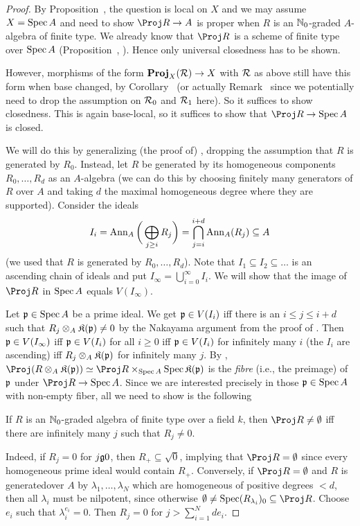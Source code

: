 \documentclass[a4paper,parskip=half,numbers=enddot, DIV=12]{scrreprt}
\begin{document}
\begin{proof}
	By Proposition~, the question is local on $X$ and we may assume $X=\operatorname{Spec} A$ and need to show $\Proj R\morphism A$ is proper when $R$ is an $\mathbb{N}_0$-graded $A$-algebra of finite type. We already know that $\Proj R$ is a scheme of finite type over $\operatorname{Spec} A$ (Proposition~, ). Hence only universal closedness has to be shown.
	
	However, morphisms of the form $\PROJ_X(\Rr)\morphism X$ with $\mathcal{R}$ as above still have this form when base changed, by Corollary~ (or actually Remark~ since we potentially need to drop the assumption on $\mathcal{R}_0$ and $\mathcal{R}_1$ here). So it suffices to show closedness. This is again base-local, so it suffices to show that $\Proj R\morphism\Spec A$ is closed. 
	
	We will do this by generalizing (the proof of) \cite[Proposition~2.6.1]{alggeo1}, dropping the assumption that $R$ is generated by $R_0$. Instead, let $R$ be generated by its homogeneous components $R_0,\ldots,R_d$ as an $A$-algebra (we can do this by choosing finitely many generators of $R$ over $A$ and taking $d$ the maximal homogeneous degree where they are supported). Consider the ideals
	\begin{align}\lbl{eq:AnnullatorIdeal}
		I_i=\Ann_A\bigg(\bigoplus_{j\geq i}R_j\bigg)=\bigcap_{j=i}^{i+d}\Ann_A(R_j)\subseteq A
	\end{align}
	(we used that $R$ is generated by $R_0,\ldots,R_d$). Note that $I_1\subseteq I_2\subseteq \ldots$ is an ascending chain of ideals and put $I_\infty=\bigcup_{i=0}^\infty I_i$. We will show that the image of $\Proj R$ in $\operatorname{Spec} A$ equals $V(I_\infty)$.
	
	Let $\mathfrak{p}\in \operatorname{Spec} A$ be a prime ideal. We get $\mathfrak{p}\in V(I_i)$ iff there is an $i\leq j\leq i+d$ such that $R_j\otimes_A\mathfrak{K}(\mathfrak{p})\neq 0$ by the Nakayama argument from the proof of \cite[Proposition~2.6.1]{alggeo1}. Then $\mathfrak{p}\in V(I_\infty)$ iff $\mathfrak{p}\in V(I_i)$ for all $i\geq 0$ iff $\mathfrak{p}\in V(I_i)$ for infinitely many $i$ (the $I_i$ are ascending) iff $R_j\otimes_A\mathfrak{K}(\mathfrak{p})$ for infinitely many $j$. By \cite[Corollary~1.3.3]{alggeo1}, $\Proj(R\otimes_A\KK(\pp))\simeq \Proj R\times_{\Spec A}\Spec \KK(\pp)$ is the \emph{fibre} (i.e., the preimage) of $\mathfrak{p}$ under $\Proj R\morphism\Spec A$. Since we are interested precisely in those $\mathfrak{p}\in\operatorname{Spec} A$ with non-empty fiber, all we need to show is the following
	\begin{claim*}
		If $R$ is an $\mathbb{N}_0$-graded algebra of finite type over a field $k$, then $\Proj R\neq\emptyset$ iff there are infinitely many $j$ such that $R_j\neq 0$.
	\end{claim*}
	Indeed, if $R_j=0$ for $j\gge 0$, then $R_+\subseteq \sqrt{0}$, implying that $\Proj R=\emptyset$ since every homogeneous prime ideal would contain $R_+$. Conversely, if $\Proj R=\emptyset$ and $R$ is generatedover $A$ by $\lambda_1,\ldots,\lambda_N$ which are homogeneous of positive degrees $<d$, then all $\lambda_i$ must be nilpotent, since otherwise $\emptyset\neq\Spec (R_{\lambda_i})_0\subseteq \Proj R$. Choose $e_i$ such that $\lambda_i^{e_i}=0$. Then $R_j=0$ for $j>\sum_{i=1}^Nde_i$.
\end{proof}
\end{document}
